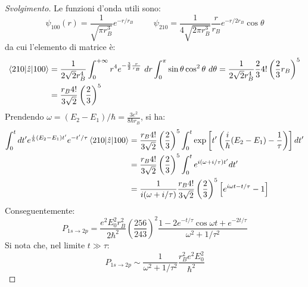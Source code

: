 \documentclass[11pt, a4paper]{scrartcl} %
\numberwithin{equation}{subsection}
\theoremstyle{style2}
\theoremstyle{style1}
\renewcommand\qedsymbol{$\blacksquare$}
\newenvironment{svolgimento}{\renewcommand\qedsymbol{$\spadesuit$}\begin{proof}[Svolgimento]}{\end{proof}}
\begin{document}
\begin{svolgimento}
Le funzioni d'onda utili sono:
\[
\psi _{100}(r) = \frac{1}{\sqrt{\pi r_B^3} } e^{- r / r_B}  \hspace{1cm} \psi _{210} = \frac{1}{4 \sqrt{2 \pi r_B^3} } \frac{r}{r_B}e^{-r / 2r_B} \cos \theta 
\] 
da cui l'elemento di matrice \`e:
\[
\begin{split}
	\braket{210|\hat{z}|100} &= \frac{1}{2 \sqrt{2} r_B^4}\int_{0} ^{+\infty} r^4 e^{-\frac{3}{2}\frac{r}{r_B}}  \ dr \int_{0} ^\pi \sin \theta  \cos^2 \theta  \ d\theta = \frac{1}{2 \sqrt{2} r_B^4} \frac{2}{3} 4! \left(\frac{2}{3}r_B\right) ^5\\
				 &=\frac{r_B 4!}{3 \sqrt{2} } \left(\frac{2}{3}\right) ^5
\end{split}
\] 
Prendendo $\omega = (E_2-E_1) / \hbar =\frac{3e^2}{8\hbar r_B} $, si ha:
\[
\begin{split}
	\int_{0} ^t dt' e^{\frac{i}{\hbar }(E_2-E_1)t'} e^{-t' /\tau } \braket{210|\hat{z}|100} &= \frac{r_B 4!}{3 \sqrt{2} }\left(\frac{2}{3}\right) ^5 \int_{0} ^t\exp \left[ t' \left(\frac{i}{\hbar }(E_2-E_1)- \frac{1}{\tau }\right)  \right] dt' \\
												&= \frac{r_B 4!}{3 \sqrt{2} }\left(\frac{2}{3}\right) ^5 \int_{0} ^t e^{i(\omega+i / \tau ) t'}   dt' \\
												&= \frac{1}{i(\omega + i /\tau )}\frac{r_B 4!}{3 \sqrt{2} }\left(\frac{2}{3}\right) ^5 \left[ e^{i\omega t - t / \tau } -1 \right] 
\end{split}
\] 
Conseguentemente:
\begin{equation}
	P_{1s\to 2p} = \frac{e^2 E_0^2 r_B^2}{2\hbar ^2}\left(\frac{256}{243}\right) ^2 \frac{1-2 e^{- t /\tau } \cos \omega t + e^{-2t /\tau } }{\omega^2 + 1/\tau ^2}
\end{equation}
Si nota che, nel limite $t \gg \tau $:
\[
P_{1s \to 2p} \sim \frac{1}{\omega^2 + 1/\tau ^2}\frac{r_B^2 e^2 E_0^2}{\hbar ^2}
\] 
\end{svolgimento}
\end{document}
